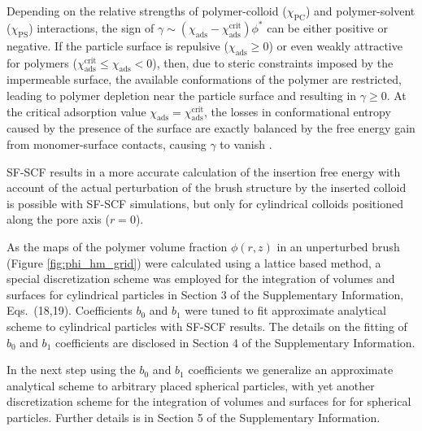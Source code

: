 \documentclass[12pt, a4paper]{article}
\begin{document}
Depending on the relative strengths of polymer-colloid ($\chi_{\text{PC}}$) and polymer-solvent ($\chi_{\text{PS}}$) interactions, the sign of $\gamma \sim (\chi_{\text{ads}} - \chi_{\text{ads}}^{\text{crit}}) \phi^{\ast}$ can be either positive or negative.
If the particle surface is repulsive ($\chi_{\text{ads}} \geq 0$) or even weakly attractive for polymers ($\chi_{\text{ads}}^{\text{crit}} \leq \chi_{\text{ads}} < 0$), then, due to steric constraints imposed by the impermeable surface, the available conformations of the polymer are restricted, leading to polymer depletion near the particle surface and resulting in $\gamma \geq 0$.
At the critical adsorption value $\chi_{\text{ads}} = \chi_{\text{ads}}^{\text{crit}}$, the losses in conformational entropy caused by the presence of the surface are exactly balanced by the free energy gain from monomer-surface contacts, causing $\gamma$ to vanish \cite{Fleer1993,Birshtein1979,Birshtein1983,Eisenriegler1982}.

SF-SCF results in a more accurate calculation of the insertion free energy with account of the actual perturbation of the brush structure by the inserted colloid is possible with SF-SCF simulations, but only for cylindrical colloids positioned along the pore axis ($r=0$).

As the maps of the polymer volume fraction $\phi(r,z)$ in an unperturbed brush (Figure \ref{fig:phi_hm_grid}) were calculated using a lattice based method, a special discretization scheme was employed for the integration of volumes and surfaces for cylindrical particles in
Section 3 of the Supplementary Information, Eqs.~(18,19).
Coefficients $b_0$ and $b_1$ were tuned to fit approximate analytical scheme to cylindrical particles with SF-SCF results.
The details on the fitting of $b_0$ and $b_1$ coefficients are disclosed in Section 4 of the Supplementary Information.

In the next step using the $b_0$ and $b_1$ coefficients we generalize an approximate analytical scheme to arbitrary placed spherical particles, with yet another discretization scheme for the integration of volumes and surfaces for for spherical particles.
Further details is in Section 5 of the Supplementary Information.
\end{document}
